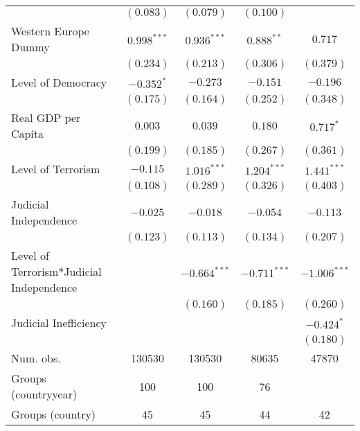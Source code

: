 \documentclass[11pt,]{article}
\begin{document}
\begin{table}
\begin{center}
\begin{tabular}{l c c c c }
                                         & $(0.083)$      & $(0.079)$      & $(0.100)$      &                \\
Western Europe Dummy                     & $0.998^{***}$  & $0.936^{***}$  & $0.888^{**}$   & $0.717$        \\
                                         & $(0.234)$      & $(0.213)$      & $(0.306)$      & $(0.379)$      \\
Level of Democracy                       & $-0.352^{*}$   & $-0.273$       & $-0.151$       & $-0.196$       \\
                                         & $(0.175)$      & $(0.164)$      & $(0.252)$      & $(0.348)$      \\
Real GDP per Capita                      & $0.003$        & $0.039$        & $0.180$        & $0.717^{*}$    \\
                                         & $(0.199)$      & $(0.185)$      & $(0.267)$      & $(0.361)$      \\
Level of Terrorism                       & $-0.115$       & $1.016^{***}$  & $1.204^{***}$  & $1.441^{***}$  \\
                                         & $(0.108)$      & $(0.289)$      & $(0.326)$      & $(0.403)$      \\
Judicial Independence                    & $-0.025$       & $-0.018$       & $-0.054$       & $-0.113$       \\
                                         & $(0.123)$      & $(0.113)$      & $(0.134)$      & $(0.207)$      \\
Level of Terrorism*Judicial Independence &                & $-0.664^{***}$ & $-0.711^{***}$ & $-1.006^{***}$ \\
                                         &                & $(0.160)$      & $(0.185)$      & $(0.260)$      \\
Judicial Inefficiency                    &                &                &                & $-0.424^{*}$   \\
                                         &                &                &                & $(0.180)$      \\
\hline
Num. obs.                                & 130530         & 130530         & 80635          & 47870          \\
Groups (countryyear)                     & 100            & 100            & 76             &                \\
Groups (country)                         & 45             & 45             & 44             & 42             \\

\end{tabular}
\end{center}
\end{table}
\end{document}
